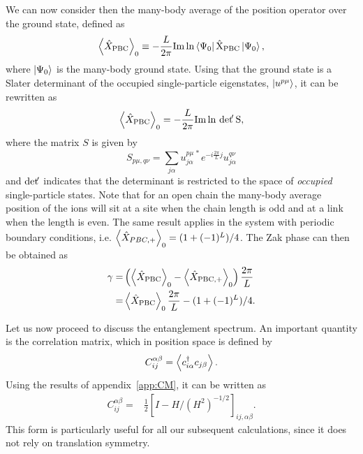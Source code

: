 \documentclass[twocolumn,amsmath,longbibliography,amssymb,superscriptaddress]{revtex4-1}
\newcommand{\carlos}[1]{{\color{red} #1}}
\begin{document}
We can now consider then the many-body average of the position operator over the ground state, defined as
\begin{align}
\expval{\hat{X}_{\rm PBC}}_0 \equiv -\frac{L}{2\pi} \rm{ Im }\ln\bra{\Psi_0}\hat{X}_{\rm PBC}\ket{\Psi_0},
\end{align}
where $\ket{\Psi_0}$ is the many-body ground state. 
Using that the ground state is a Slater determinant of the occupied single-particle eigenstates, $\ket{u^{p\mu}}$, it can be rewritten as~\cite{Resta1997}
\begin{align}
\expval{\hat{X}_{\rm PBC}}_0 = -\frac{L}{2\pi} \rm{Im }\ln \, {\rm det }\!' \, S,
\end{align}
where the matrix $S$ is given by
\begin{equation}
S_{p\mu,q\nu} = \sum_{j\alpha} u^{p\mu\, \ast}_{j \alpha} e^{-i\frac{2\pi}{L}j}u^{q\nu}_{j \alpha}
\end{equation}
and  ${\rm det }\!' $ indicates that the determinant is restricted to the space of \emph{occupied} single-particle states. Note that for an open chain the many-body average position of the ions will sit at a site when the chain length is odd and at a link when the length is even. The same result applies in the system with periodic boundary conditions, i.e. $\expval{\hat{X}_{PBC,+}}_{0}=(1+(-1)^{L})/4$.
The Zak phase can then be obtained as
\begin{align}
\gamma =& \left( \expval{\hat{X}_{\rm PBC}}_0-\expval{\hat{X}_{\rm PBC,+}}_0 \right)\frac{2\pi}{L} \\
=& \expval{\hat{X}_{\rm PBC}}_0\frac{2\pi}{L} -(1+(-1)^{L})/4.
\end{align}

Let us now proceed to discuss the entanglement spectrum. 
An important quantity is the correlation matrix, which in position space is defined by
\begin{align}
C_{ij}^{\alpha \beta} = \expval{c_{i\alpha}^\dagger c_{j\beta}}.
\end{align}
Using the results of appendix~\ref{app:CM}, it  can be written  as
\begin{align}\label{eq:corr_mat2}
C_{ij}^{\alpha \beta} =& \frac{1}{2}\left[I - H/ (H^2)^{-1/2} \right]_{ij, \alpha \beta}.
\end{align}
This form is particularly useful for all our subsequent calculations, since it does not rely on translation symmetry. 
\end{document}
